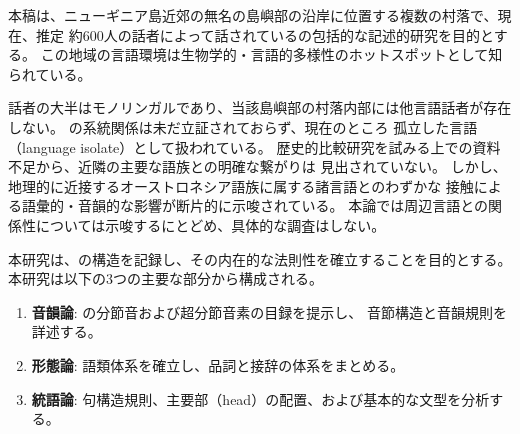 \label{sec:introduction}

本稿は、ニューギニア島近郊の無名の島嶼部の沿岸に位置する複数の村落で、現在、推定
約600人の話者によって話されている\langname の包括的な記述的研究を目的とする。
この地域の言語環境は生物学的・言語的多様性のホットスポットとして知られている。

\langname 話者の大半はモノリンガルであり、当該島嶼部の村落内部には他言語話者が存在しない。
\langname の系統関係は未だ立証されておらず、現在のところ
孤立した言語（language isolate）として扱われている。
歴史的比較研究を試みる上での資料不足から、近隣の主要な語族との明確な繋がりは
見出されていない。
しかし、地理的に近接するオーストロネシア語族に属する諸言語とのわずかな
接触による語彙的・音韻的な影響が断片的に示唆されている。
本論では周辺言語との関係性については示唆するにとどめ、具体的な調査はしない。

本研究は、\langname の構造を記録し、その内在的な法則性を確立することを目的とする。
本研究は以下の3つの主要な部分から構成される。

\begin{enumerate}
    \item \textbf{音韻論}: \langname の分節音および超分節音素の目録を提示し、
    音節構造と音韻規則を詳述する。
    \item \textbf{形態論}: 語類体系を確立し、品詞と接辞の体系をまとめる。
    \item \textbf{統語論}: 句構造規則、主要部（head）の配置、および基本的な文型を分析する。
\end{enumerate}
